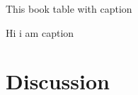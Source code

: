 \documentclass[12pt]{article}
\begin{document}
This book table with caption
\par
\begin{table}[H]
    \centering
    \caption{Hi i am caption}
    \label{tab:my_label}
\end{table}


\section{Discussion}

 
\end{document}
